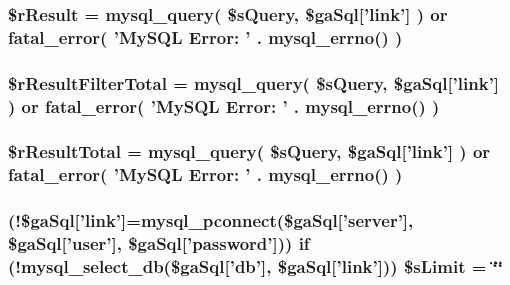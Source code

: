 \hypertarget{filter__col_8php_a8f423fcb1764890d70da997a4140f703}{
\subsubsection[{\$r\+Result}]{\setlength{\rightskip}{0pt plus 5cm}\$r\+Result = mysql\+\_\+query( \$s\+Query, \$ga\+Sql\mbox{[}'link'\mbox{]} ) or {\bf fatal\+\_\+error}( 'My\+S\+Q\+L Error\+: ' . mysql\+\_\+errno() )}}\label{filter__col_8php_a8f423fcb1764890d70da997a4140f703}
\hypertarget{filter__col_8php_a29b3b8a9782e4c5b8157be2ba70a33e1}{
\subsubsection[{\$r\+Result\+Filter\+Total}]{\setlength{\rightskip}{0pt plus 5cm}\$r\+Result\+Filter\+Total = mysql\+\_\+query( \$s\+Query, \$ga\+Sql\mbox{[}'link'\mbox{]} ) or {\bf fatal\+\_\+error}( 'My\+S\+Q\+L Error\+: ' . mysql\+\_\+errno() )}}\label{filter__col_8php_a29b3b8a9782e4c5b8157be2ba70a33e1}
\hypertarget{filter__col_8php_a48722b6bbefe9d4cb748bf0c3f936272}{
\subsubsection[{\$r\+Result\+Total}]{\setlength{\rightskip}{0pt plus 5cm}\$r\+Result\+Total = mysql\+\_\+query( \$s\+Query, \$ga\+Sql\mbox{[}'link'\mbox{]} ) or {\bf fatal\+\_\+error}( 'My\+S\+Q\+L Error\+: ' . mysql\+\_\+errno() )}}\label{filter__col_8php_a48722b6bbefe9d4cb748bf0c3f936272}
\hypertarget{filter__col_8php_a867f070c3b4e597275c622aac60de587}{
\subsubsection[{\$s\+Limit}]{ (!\$ga\+Sql\mbox{[}'link'\mbox{]}=mysql\+\_\+pconnect(\$ga\+Sql\mbox{[}'server'\mbox{]}, \$ga\+Sql\mbox{[}'user'\mbox{]}, \$ga\+Sql\mbox{[}'password'\mbox{]})) {\bf if} (!mysql\+\_\+select\+\_\+db(\$ga\+Sql\mbox{[}'db'\mbox{]}, \$ga\+Sql\mbox{[}'link'\mbox{]})) \$s\+Limit = \char`\"{}\char`\"{}}}\label{filter__col_8php_a867f070c3b4e597275c622aac60de587}
